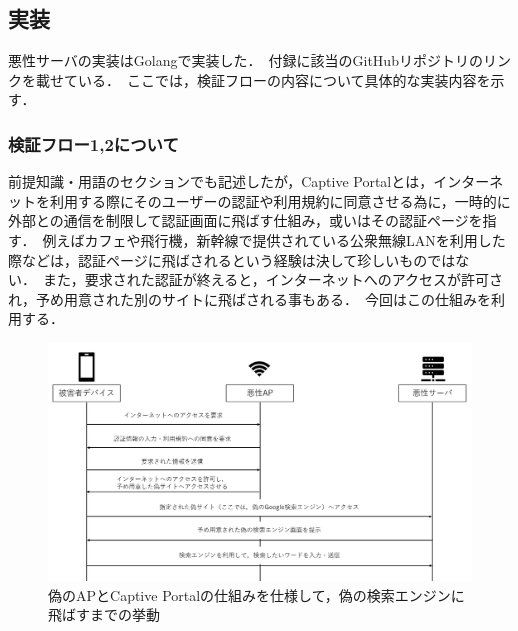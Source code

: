 \documentclass[dvipdfmx]{jsarticle}
\begin{document}
        \subsection{実装}
            悪性サーバの実装はGolangで実装した．\
            付録に該当のGitHubリポジトリのリンクを載せている．\
            ここでは，検証フローの内容について具体的な実装内容を示す．\
            \subsubsection{検証フロー1,2について}
                前提知識・用語のセクションでも記述したが，Captive Portalとは，インターネットを利用する際にそのユーザーの認証や利用規約に同意させる為に，一時的に外部との通信を制限して認証画面に飛ばす仕組み，或いはその認証ページを指す．\
                例えばカフェや飛行機，新幹線で提供されている公衆無線LANを利用した際などは，認証ページに飛ばされるという経験は決して珍しいものではない．\
                また，要求された認証が終えると，インターネットへのアクセスが許可され，予め用意された別のサイトに飛ばされる事もある．\
                今回はこの仕組みを利用する．\
                \begin{figure}
                    \centering
                    \includegraphics[width=15cm]{img/vc-vf-1-2.png}
                    \caption{偽のAPとCaptive Portalの仕組みを仕様して，偽の検索エンジンに飛ばすまでの挙動}
                    \label{flow-no12}
                \end{figure}
\end{document}

